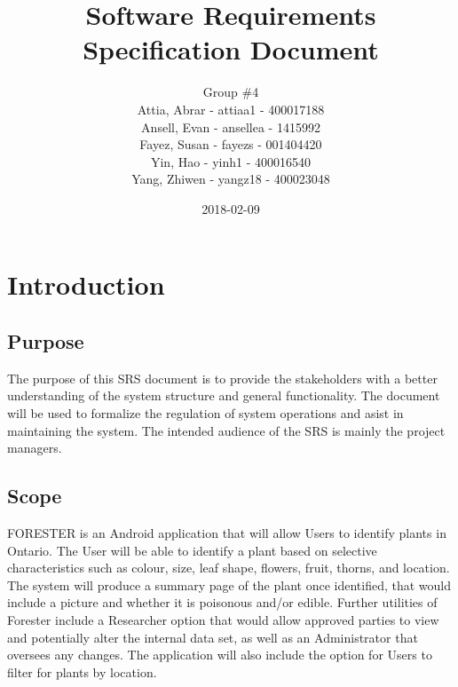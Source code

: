 \documentclass[]{article}
\title{Software Requirements Specification Document}
\author{Group \#4 \\
Attia, Abrar - attiaa1 - 400017188 \\
Ansell, Evan - ansellea - 1415992 \\
Fayez, Susan - fayezs - 001404420 \\
Yin, Hao - yinh1 - 400016540 \\
Yang, Zhiwen - yangz18 - 400023048 }
\date{2018-02-09}
\begin{document}
\maketitle	

\newpage

\section{Introduction}
\label{sec:introduction}

\subsection{Purpose}
\label{sub:purpose}
{\color{red}
The purpose of this SRS document is to provide the stakeholders with a better understanding of the system structure and general functionality. The document will be used to formalize the regulation of system operations and asist in maintaining the system. The intended audience of the SRS is mainly the project managers.}

\subsection{Scope}
\label{sub:scope}
FORESTER is an Android application that will allow Users to identify plants in Ontario.{\color{red} The User will be able to identify a plant based on selective characteristics such as colour, size, leaf shape, flowers, fruit, thorns, and location}. The system will produce a summary page of the plant once identified, that would include a picture and whether it is poisonous and/or edible. Further utilities of Forester include a Researcher option that would allow approved parties to view and potentially alter the internal data set, as well as an Administrator that oversees any changes. The application will also include the option for Users to filter for plants by location.

\end{document}
